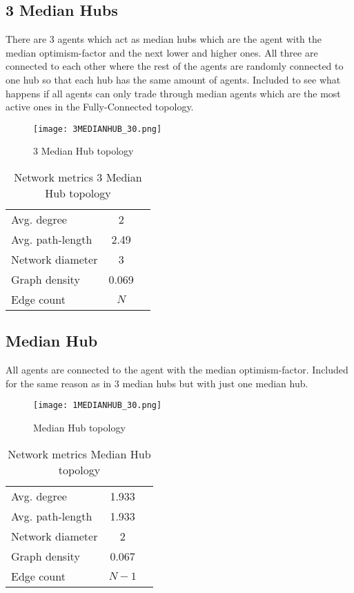 \documentclass[Bachelorarbeit.tex]{subfiles}
\begin{document}
\pagebreak

\subsection{3 Median Hubs}
There are 3 agents which act as median hubs which are the agent with the median optimism-factor and the next lower and higher ones. All three are connected to each other where the rest of the agents are randomly connected to one hub so that each hub has the same amount of agents. Included to see what happens if all agents can only trade through median agents which are the most active ones in the Fully-Connected topology.

\begin{figure}[H]
	\centering
  \texttt{[image: 3MEDIANHUB\_30.png]}
	\caption{3 Median Hub topology}
	\label{fig:topology_3MEDIANHUB_30}
\end{figure}

\begin{table}[H]
	\centering
	\caption{Network metrics 3 Median Hub topology}
	\begin{tabular} { l c r }
		\hline
		Avg. degree & 2 \\
		Avg. path-length & 2.49 \\
		Network diameter & 3 \\
		Graph density & 0.069 \\
		Edge count & $N$ \\
		\hline
	\end{tabular}
\end{table}

\pagebreak

\subsection{Median Hub}
All agents are connected to the agent with the median optimism-factor. Included for the same reason as in 3 median hubs but with just one median hub.

\begin{figure}[H]
	\centering
  \texttt{[image: 1MEDIANHUB\_30.png]}
	\caption{Median Hub topology}
	\label{fig:topology_1MEDIANHUB_30}
\end{figure}

\begin{table}[H]
	\centering
	\caption{Network metrics Median Hub topology}
	\begin{tabular} { l c r }
		\hline
		Avg. degree & 1.933 \\
		Avg. path-length & 1.933 \\
		Network diameter & 2 \\
		Graph density & 0.067 \\
		Edge count & $N-1$ \\
		\hline
	\end{tabular}
\end{table}
\end{document}
